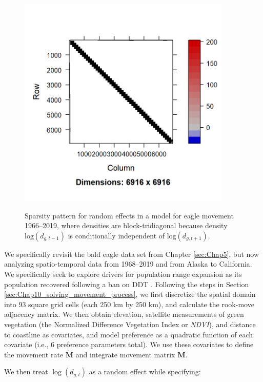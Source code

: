 \begin{figure}[!ht]
    \caption[Sparsity pattern for bald eagle movement model]{Sparsity pattern for random effects in a model for eagle movement 1966--2019, where densities are block-tridiagonal because density \( \mathrm{log}(d_{g,t-1}) \) is conditionally independent of \( \mathrm{log}(d_{g,t+1}) \).}
\centering
    \includegraphics[width=4in]{Chap_10/Eagle_sparsity.png}
    \label{fig:Chap10_eagle_sparsity}
\end{figure}

We specifically revisit the bald eagle data set from Chapter \ref{sec:Chap5}, but now analyzing spatio-temporal data from 1968--2019 and from Alaska to California.  We specifically seek to explore drivers for population range expansion as its population recovered following a ban on DDT \cite{eakle_wintering_2015}.  Following the steps in Section \ref{sec:Chap10_solving_movement_process}, we first discretize the spatial domain into 93 square grid cells (each 250 km by 250 km), and calculate the rook-move adjacency matrix.  We then obtain elevation, satellite measurements of green vegetation (the Normalized Difference Vegetation Index or \textit{NDVI}), and distance to coastline as covariates, and model preference as a quadratic function of each covariate (i.e., 6 preference parameters total).  We use these covariates to define the movement rate \(\dot{\mathbf{M}}\) and integrate movement matrix \(\mathbf{M}\).    

We then treat \( \log(d_{g,t}) \) as a random effect while specifying:

